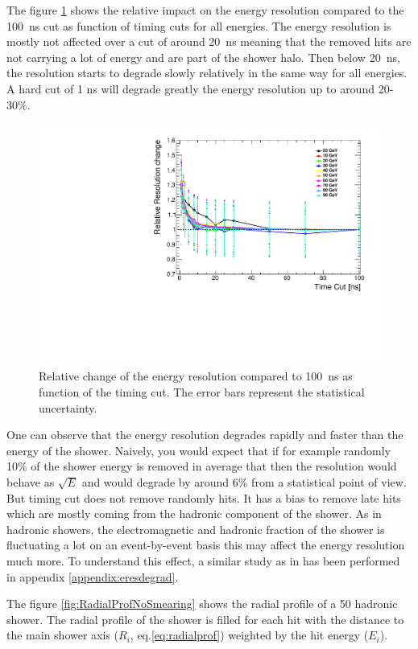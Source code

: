 The figure \ref{fig:resoRelativeNoSmearing} shows the relative impact on the energy resolution compared to the \SI{100}{\nano\second} cut as function of timing cuts for all energies. The energy resolution is mostly not affected over a cut of around \SI{20}{\nano\second} meaning that the removed hits are not carrying a lot of energy and are part of the shower halo. Then below \SI{20}{\nano\second}, the resolution starts to degrade slowly relatively in the same way for all energies. A hard cut of 1 ns will degrade greatly the energy resolution up to around 20-30\%.

\begin{figure}[htbp!]
  \centering
  \includegraphics[width=0.7\linewidth]{../Thesis_Plots/ILD/NoSmearing/Plots/ShowerReso_TimeCuts_noSmearing}
  \caption{Relative change of the energy resolution compared to \SI{100}{\nano\second} as function of the timing cut. The error bars represent the statistical uncertainty.} \label{fig:resoRelativeNoSmearing}
\end{figure}

One can observe that the energy resolution degrades rapidly and faster than the energy of the shower. Naively, you would expect that if for example randomly 10\% of the shower energy is removed in average that then the resolution would behave as $\sqrt{E}$ and would degrade by around 6\% from a statistical point of view. But timing cut does not remove randomly hits. It has a bias to remove late hits which are mostly coming from the hadronic component of the shower. As in hadronic showers, the electromagnetic and hadronic fraction of the shower is fluctuating a lot on an event-by-event basis this may affect the energy resolution much more. To understand this effect, a similar study as in \cite{SoftCompNew2012} has been performed in appendix \ref{appendix:eresdegrad}.

The figure \ref{fig:RadialProfNoSmearing} shows the radial profile of a 50 \GeV hadronic shower. The radial profile of the shower is filled for each hit with the distance to the main shower axis ($R_{i}$, eq.\ref{eq:radialprof})  weighted by the hit energy ($E_{i}$).


